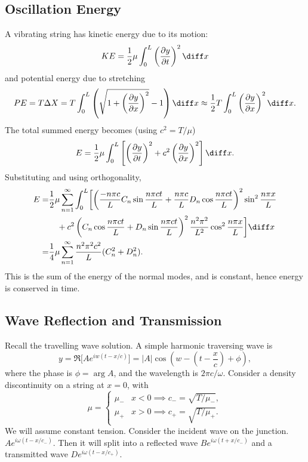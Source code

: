 \documentclass[12pt]{article}
\begin{document}
\subsection{Oscillation Energy}%
\label{sub:oscillation_energy}

A vibrating string has kinetic energy due to its motion:
\[
	KE = \frac{1}{2} \mu \int_{0}^{L} \left( \frac{\partial y}{\partial t}\right)^2 \diff x
\]
and potential energy due to stretching
\[
	PE = T \Delta X = T \int_{0}^{L} \left( \sqrt{1 + \left( \frac{\partial y}{\partial x} \right)^2} - 1 \right) \diff x \approx \frac{1}{2} T \int_{0}^{L} \left( \frac{\partial y}{\partial x}\right)^2 \diff x
.\]
The total summed energy becomes (using $c^2 = T/\mu$)
\[
	E = \frac{1}{2} \mu \int_{0}^{L} \left[ \left( \frac{\partial y}{\partial t} \right)^2 + c^2 \left( \frac{\partial y}{\partial x} \right)^2 \right] \diff x
.\]
Substituting and using orthogonality,
\begin{align*}
	E =& \frac{1}{2} \mu \sum_{n = 1}^{\infty} \int_{0}^{L} \biggl[ \left( \frac{- n \pi c}{L} C_n \sin \frac{n \pi c t}{L} + \frac{n \pi c}{L}D_n \cos \frac{n \pi c t}{L} \right)^2 \sin^2 \frac{n \pi x}{L} \\
	  & \quad + c^2 \left( C_n \cos \frac{n \pi c t}{L} + D_n \sin \frac{n \pi c t}{L} \right)^2 \frac{n^2 \pi^2}{L^2} \cos^2 \frac{n \pi x}{L} \biggr]\diff x \\
		=& \frac{1}{4} \mu \sum_{n = 1}^{\infty} \frac{n^2 \pi^2 c^2}{L}(C_n^2 + D_n^2).
\end{align*}
This is the sum of the energy of the normal modes, and is constant, hence energy is conserved in time.

\subsection{Wave Reflection and Transmission}%
\label{sub:wave_reflection_and_transmission}

Recall the travelling wave solution. A simple harmonic traversing wave is
\[
	y = \Re \bigl[ A e^{iw (t - x/c)} \bigr] = |A| \cos \left( w - \left( t - \frac{x}{c} \right) + \phi \right)
,\]
where the phase is $\phi = \arg A$, and the wavelength is $2 \pi c / \omega$. Consider a density discontinuity on a string at $x = 0$, with
\[
\mu =
\begin{cases}
	\mu_{-} & x < 0 \implies c_{-} = \sqrt{T/\mu_{-}}, \\
	\mu_{+} & x > 0 \implies c_{+} = \sqrt{T/\mu_{+}}.
\end{cases}
\]
We will assume constant tension. Consider the incident wave on the junction. $Ae^{i \omega(t - x/c_{-})}$. Then it will split into a reflected wave $Be^{i \omega(t + x/c_{-})}$ and a transmitted wave $De^{i\omega(t - x/c_{+})}$. 
\end{document}
